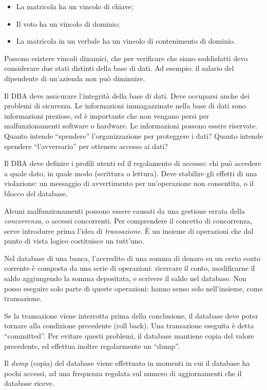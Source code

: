 \begin{itemize}
    \item La matricola ha un vincolo di chiave;
    \item Il voto ha un vincolo di dominio;
    \item La matricola in un verbale ha un vincolo di contenimento di dominio.
\end{itemize}

Possono esistere vincoli dinamici, che per verificare che siano soddisfatti devo considerare due stati distinti della base di dati. Ad esempio: il salario del dipendente di un'azienda non pu\`o diminuire.

Il DBA deve assicurare l'integrit\`a della base di dati. Deve occuparsi anche dei problemi di sicurezza. Le informazioni immagazzinate nella base di dati sono informazioni preziose, ed \`e importante che non vengano persi per malfunzionamenti software o hardware. Le informazioni possono essere riservate. Quanto intende ``spendere'' l'organizzazione per proteggere i dati? Quanto intende spendere ``l'avversario'' per ottenere accesso ai dati?

Il DBA deve definire i profili utenti ed il regolamento di accesso: chi pu\`o accedere a quale dato, in quale modo (scrittura o lettura). Deve stabilire gli effetti di una violazione: un messaggio di avvertimento per un'operazione non consentita, o il blocco del database.

Alcuni malfunzionamenti possono essere causati da una gestione errata della \emph{concorrenza}, o accessi concorrenti. Per comprendere il concetto di concorrenza, serve introdurre prima l'idea di \emph{transazione}. \`E un insieme di operazioni che dal punto di vista logico costituisce un tutt'uno.

Nel database di una banca, l'accredito di una somma di denaro su un certo conto corrente \`e composta da una serie di operazioni: ricercare il conto, modificarne il saldo aggiungendo la somma depositata, e scrivere il saldo nel database. Non posso eseguire solo parte di queste operazioni: hanno senso solo nell'insieme, come transazione.

Se la transazione viene interrotta prima della conclusione, il database deve poter tornare alla condizione precedente (roll back). Una transazione eseguita \`e detta ``committed''. Per evitare questi problemi, il database mantiene copia del valore precedente, ed effettua inoltre regolarmente un ``dump''.

Il \emph{dump} (copia) del database viene effettuato in momenti in cui il database ha pochi accessi, ad una frequenza regolata sul numero di aggiornamenti che il database riceve.

